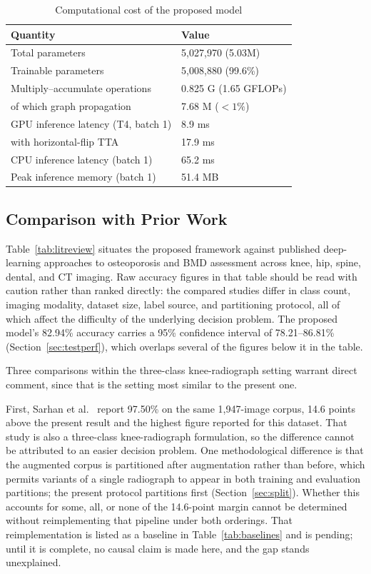 \documentclass[journal]{IEEEtran}
\begin{document}
\begin{table}[!t]
\centering
\caption{Computational cost of the proposed model}
\label{tab:efficiency}
\footnotesize
\begin{tabular}{@{}l l@{}}
\toprule
\textbf{Quantity} & \textbf{Value} \\
\midrule
Total parameters & 5,027,970 (5.03M) \\
Trainable parameters & 5,008,880 (99.6\%) \\
Multiply--accumulate operations & 0.825 G (1.65 GFLOPs) \\
\quad of which graph propagation & 7.68 M ($<1\%$) \\
GPU inference latency (T4, batch 1) & 8.9 ms \\
\quad with horizontal-flip TTA & 17.9 ms \\
CPU inference latency (batch 1) & 65.2 ms \\
Peak inference memory (batch 1) & 51.4 MB \\
\bottomrule
\end{tabular}
\end{table}

\subsection{Comparison with Prior Work}
\label{sec:comparison}
Table~\ref{tab:litreview} situates the proposed framework against published
deep-learning approaches to osteoporosis and BMD assessment across knee, hip,
spine, dental, and CT imaging. Raw accuracy figures in that table should be read
with caution rather than ranked directly: the compared studies differ in class
count, imaging modality, dataset size, label source, and partitioning protocol,
all of which affect the difficulty of the underlying decision problem. The
proposed model's 82.94\% accuracy carries a 95\% confidence interval of
78.21--86.81\% (Section~\ref{sec:testperf}), which overlaps several of the
figures below it in the table.

Three comparisons within the three-class knee-radiograph setting warrant direct
comment, since that is the setting most similar to the present one.

First, Sarhan et al.\ \cite{Sarhan2024} report 97.50\% on the same 1,947-image
corpus, 14.6 points above the present result and the highest figure reported for
this dataset. That study is also a three-class knee-radiograph formulation, so
the difference cannot be attributed to an easier decision problem. One
methodological difference is that the augmented corpus is partitioned after
augmentation rather than before, which permits variants of a single radiograph
to appear in both training and evaluation partitions; the present protocol
partitions first (Section~\ref{sec:split}). Whether this accounts for some,
all, or none of the 14.6-point margin cannot be determined without
reimplementing that pipeline under both orderings. That reimplementation is
listed as a baseline in Table~\ref{tab:baselines} and is pending; until it is
complete, no causal claim is made here, and the gap stands unexplained.
\end{document}
